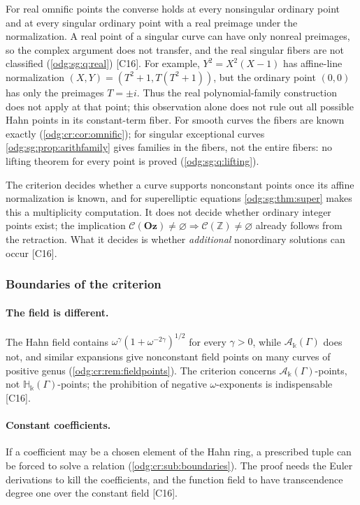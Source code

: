 \documentclass[11pt,oneside]{article}
\numberwithin{equation}{section}
\theoremstyle{definition}
\theoremstyle{remark}
\newcommand{\Oz}{\mathbf{Oz}}
\newcommand{\Z}{\mathbb Z}
\newcommand{\src}[1]{\textup{\textsf{\small[#1]}}}
\newcommand{\crH}{\mathbb H_\Bbbk(\Gamma)}
\newcommand{\crA}{\mathcal A_\Bbbk(\Gamma)}
\begin{document}
For real omnific points the converse holds at every nonsingular ordinary point and at every
singular ordinary point with a real preimage under the normalization. A real point of a
singular curve can have only nonreal preimages, so the complex argument does not transfer,
and the real singular fibers are not classified (\cref{odg:sg:q:real}) \src{C16}.
For example, $Y^2=X^2(X-1)$ has affine-line normalization
$(X,Y)=(T^2+1,T(T^2+1))$, but the ordinary point $(0,0)$ has only the
preimages $T=\pm i$. Thus the real polynomial-family construction does not
apply at that point; this observation alone does not rule out all possible
Hahn points in its constant-term fiber. For
smooth curves the fibers are known exactly (\cref{odg:cr:cor:omnific}); for singular
exceptional curves \cref{odg:sg:prop:arithfamily} gives families in the fibers, not the
entire fibers: no lifting theorem for every point is proved
(\cref{odg:sg:q:lifting}).

The criterion decides whether a curve supports nonconstant points once its affine
normalization is known, and for superelliptic equations \cref{odg:sg:thm:super} makes this a
multiplicity computation. It does not decide whether ordinary integer points exist; the
implication $\mathcal C(\Oz)\ne\varnothing\Rightarrow\mathcal C(\Z)\ne\varnothing$ already
follows from the retraction. What it decides is whether \emph{additional} nonordinary
solutions can occur \src{C16}.

\subsubsection{Boundaries of the criterion}\label{odg:sg:sub:boundaries}

\paragraph{The field is different.} The Hahn field contains
$\omega^\gamma(1+\omega^{-2\gamma})^{1/2}$ for every $\gamma>0$, while $\crA$ does not, and
similar expansions give nonconstant field points on many curves of positive genus
(\cref{odg:cr:rem:fieldpoints}). The criterion concerns $\crA$-points, not $\crH$-points;
the prohibition of negative $\omega$-exponents is indispensable \src{C16}.

\paragraph{Constant coefficients.} If a coefficient may be a chosen element of the Hahn
ring, a prescribed tuple can be forced to solve a relation
(\cref{odg:cr:sub:boundaries}). The proof needs the Euler derivations to kill the
coefficients, and the function field to have transcendence degree one over the constant
field \src{C16}.
\end{document}
